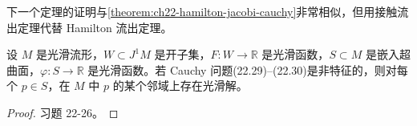 \documentclass[../../main.tex]{subfiles}
\begin{document}
下一个定理的证明与\cref{theorem:ch22-hamilton-jacobi-cauchy}非常相似，但用接触流出定理代替 Hamilton 流出定理。

\begin{theorem}\label{theorem:ch22-general-cauchy}
设 $M$ 是光滑流形，$W\subset J^1M$ 是开子集，$F:W\to\mathbb R$ 是光滑函数，$S\subset M$ 是嵌入超曲面，$\varphi:S\to\mathbb R$ 是光滑函数。若 Cauchy 问题(22.29)--(22.30)是非特征的，则对每个 $p\in S$，在 $M$ 中 $p$ 的某个邻域上存在光滑解。
\end{theorem}

\begin{proof}
习题 22-26。
\end{proof}
\end{document}
